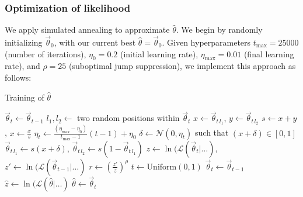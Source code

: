 \subsubsection{Optimization of likelihood}
We apply simulated annealing \cite{metropolis53,kirkpatrick83} to approximate $\hat\theta$. We begin by randomly initializing $\vec\theta_0$, with our current best $\hat\theta = \vec\theta_0$. Given hyperparameters $t_\text{max} = 25000$ (number of iterations), $\eta_0 = 0.2$ (initial learning rate), $\eta_\text{max} = 0.01$ (final learning rate), and $\rho = 25$ (suboptimal jump suppression), we implement this approach as follows: \\
\begin{minipage}{0.8\textwidth}
    \begin{algorithm}[H]
        \caption{Training of $\hat\theta$}
        \begin{algorithmic}[1]
                \State $\vec\theta_t \gets \vec\theta_{t-1}$
                \State $l_1, l_2 \gets$ two random positions within $\vec\theta_t$
    			\State $x \gets \vec\theta_{t\,l_1}$, $y \gets \vec\theta_{t\,l_2}$ 
    			\State $s \gets x+y$, $x \gets \frac{x}{s}$
    			\State $\eta_t \gets \frac{(\eta_\text{max} - \eta_0)}{t_\text{max}-1}(t-1) + \eta_0$ 
    			\State $\delta \gets \mathcal{N}(0, \eta_t)$ such that $(x + \delta) \in [0,1]$
    			\State $\vec\theta_{t\,l_1} \gets s(x + \delta)$, $\vec\theta_{t\,l_2} \gets s(1 - \vec\theta_{t\,l_1})$
    			\State $z \gets \ln(\mathcal{L}(\vec\theta_t | \ldots)$, $z' \gets \ln(\mathcal{L}(\vec\theta_{t-1} | \ldots)$ 
    			\State $r \gets (\!\frac{z'}{z}\!)^\rho$ 
    			\State $t \gets \text{Uniform}(0, 1)$
    			 
    			    \State $\vec\theta_t \gets \vec\theta_{t-1}$
    		    \Else {}
    		        \State $\hat{z} \gets \ln(\mathcal{L}(\hat\theta | \ldots)$
    		            \State $\hat\theta \gets \vec\theta_t$ 
    		        \EndIf
    			\EndIf
            \EndFor
        \end{algorithmic}
    \end{algorithm}
\end{minipage}\par
\vspace{\baselineskip}

